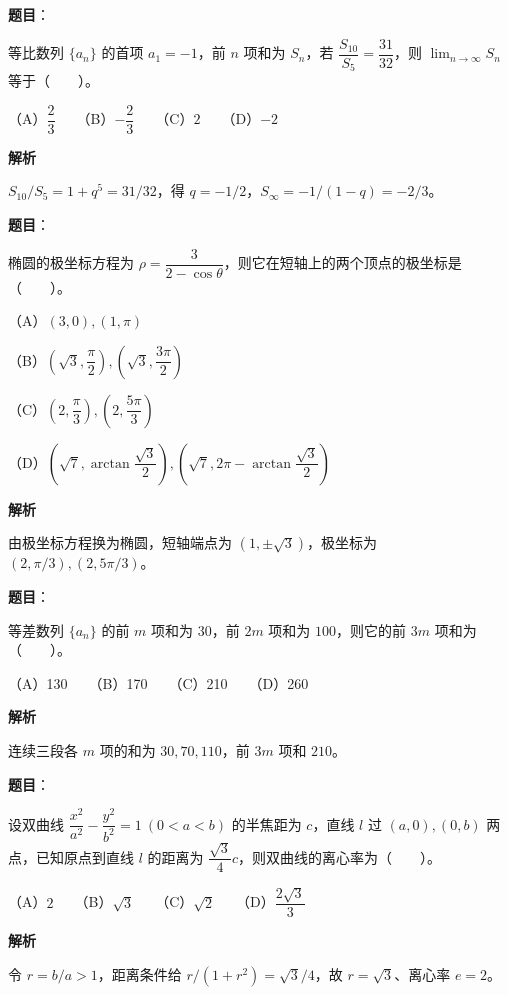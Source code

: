 \begin{answer}

\textbf{题目}：

等比数列 $\{a_n\}$ 的首项 $a_1=-1$，前 $n$ 项和为 $S_n$，若 $\dfrac{S_{10}}{S_5}=\dfrac{31}{32}$，则 $\displaystyle\lim_{n\to\infty}S_n$ 等于\mbox{（　　）}。

（A）$\dfrac23$　　（B）$-\dfrac23$　　（C）$2$　　（D）$-2$

\textbf{解析}

$S_{10}/S_5=1+q^5=31/32$，得 $q=-1/2$，$S_\infty=-1/(1-q)=-2/3$。


\end{answer}
\begin{answer}

\textbf{题目}：

椭圆的极坐标方程为 $\rho=\dfrac{3}{2-\cos\theta}$，则它在短轴上的两个顶点的极坐标是\mbox{（　　）}。

（A）$(3,0),(1,\pi)$

（B）$\left(\sqrt{3},\dfrac{\pi}{2}\right),\left(\sqrt{3},\dfrac{3\pi}{2}\right)$

（C）$\left(2,\dfrac{\pi}{3}\right),\left(2,\dfrac{5\pi}{3}\right)$

（D）$\left(\sqrt{7},\arctan\dfrac{\sqrt{3}}{2}\right),\left(\sqrt{7},2\pi-\arctan\dfrac{\sqrt{3}}{2}\right)$

\textbf{解析}

由极坐标方程换为椭圆，短轴端点为 $(1,\pm\sqrt3)$，极坐标为 $(2,\pi/3),(2,5\pi/3)$。


\end{answer}
\begin{answer}

\textbf{题目}：

等差数列 $\{a_n\}$ 的前 $m$ 项和为 $30$，前 $2m$ 项和为 $100$，则它的前 $3m$ 项和为\mbox{（　　）}。

（A）130　　（B）170　　（C）210　　（D）260

\textbf{解析}

连续三段各 $m$ 项的和为 $30,70,110$，前 $3m$ 项和 $210$。


\end{answer}
\begin{answer}

\textbf{题目}：

设双曲线 $\dfrac{x^2}{a^2}-\dfrac{y^2}{b^2}=1\ (0<a<b)$ 的半焦距为 $c$，直线 $l$ 过 $(a,0),(0,b)$ 两点，已知原点到直线 $l$ 的距离为 $\dfrac{\sqrt{3}}{4}c$，则双曲线的离心率为\mbox{（　　）}。

（A）$2$　　（B）$\sqrt{3}$　　（C）$\sqrt{2}$　　（D）$\dfrac{2\sqrt{3}}{3}$

\textbf{解析}

令 $r=b/a>1$，距离条件给 $r/(1+r^2)=\sqrt3/4$，故 $r=\sqrt3$、离心率 $e=2$。


\end{answer}
